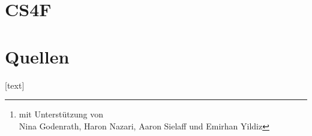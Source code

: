 \usepackage{csff}





\title[\MMkrz]{\MMname}   
\author{Julia Padberg\footnote{\scriptsize mit Unterstützung von \\Nina Godenrath, Haron Nazari, Aaron Sielaff und Emirhan Yildiz}}
\date{Februar 2024}


\newcommand{\CSfF}{\textbf{{\color{blue}CS4F}}}
\newcommand{\COze}{CO$_{2e}$}
\newcommand{\COz}{CO$_{2}$}



\subtitle{Mikromodul  }
\frame{\titlepage} 



%

\section{CS4F}


\section{Quellen}

\footnotesize

[text]

 
%
%

